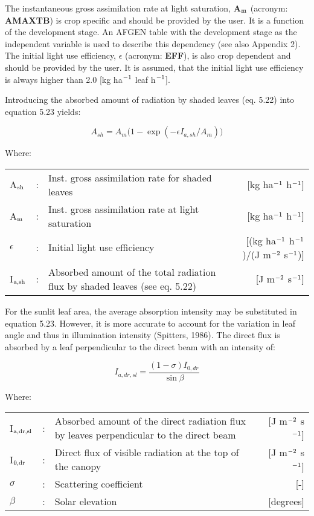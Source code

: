 The instantaneous gross assimilation rate at light saturation, {\bf A$_{{\rm m}}$} (acronym: {\bf AMAXTB}) is
crop specific and should be provided by the user. It is a function of the development
stage. An AFGEN table with the development stage as the independent variable is used to
describe this dependency (see also Appendix 2). The initial light use efficiency, {\bf $\epsilon$}
(acronym: {\bf EFF}), is also crop dependent and should be provided by the user. It is
assumed, that the initial light use efficiency is always higher than 2.0 [kg ha$^{{\rm -1}}$ leaf h$^{{\rm -1}}$]. 

Introducing the absorbed amount of radiation by shaded leaves (eq. 5.22) into equation 5.23 yields:

\begin{equation}
A_{sh} = A_{m} \big(1-\exp({{-\epsilon I_{a,sh} }/{A_m}} ) \big)
\end{equation}

Where:\\[5pt]
\begin{tabularx}{\textwidth}{llXr}
A$_{{\rm sh}}$ &:& Inst. gross assimilation rate for shaded leaves  & 
    [kg ha$^{{\rm -1}}$ h$^{{\rm -1}}$]\\
A$_{{\rm m}}$ &:& Inst. gross assimilation rate at light saturation & 
    [kg ha$^{{\rm -1}}$ h$^{{\rm -1}}$]\\
$\epsilon$ &:& Initial light use efficiency  &  
    [(kg ha$^{{\rm -1}}$ h$^{{\rm -1}}$)/(J m$^{{\rm -2}}$ s$^{{\rm -1}}$)]\\
I$_{{\rm a,sh}}$ &:& Absorbed amount of the total radiation flux  by shaded leaves (see eq. 5.22)   &
     [J m$^{{\rm -2}}$ s$^{{\rm -1}}$]\\
\end{tabularx}

For the sunlit leaf area, the average absorption intensity may be substituted in equation
5.23. However, it is more accurate to account for the variation in leaf angle and thus in
illumination intensity (Spitters, 1986). The direct flux is absorbed by a leaf perpendicular
to the direct beam with an intensity of: 

\begin{equation}
I_{a,dr,sl} = {\frac{(1-\sigma) I_{0,dr}}{\sin \beta }}
\end{equation}

Where:\\[5pt]
\begin{tabularx}{\textwidth}{llXr}
I$_{{\rm a,dr,sl}}$ &:& Absorbed amount of the direct radiation flux by leaves
   perpendicular to the direct beam    &    [J m$^{{\rm -2}}$ s$^{{\rm -1}}$]\\
I$_{{\rm 0,dr}}$ &:& Direct flux of visible radiation at the top of 
   the canopy &  [J m$^{{\rm -2}}$ s$^{{\rm -1}}$]\\
$\sigma$ &:& Scattering coefficient  &[-]\\
$\beta$ &:& Solar elevation   & [degrees]\\
\end{tabularx}

